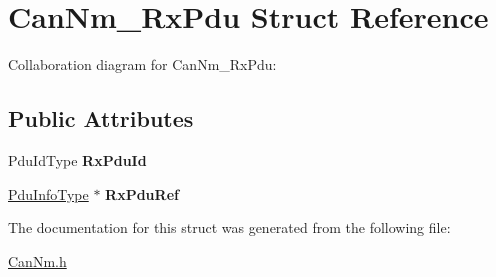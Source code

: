 \hypertarget{structCanNm__RxPdu}{}\section{Can\+Nm\+\_\+\+Rx\+Pdu Struct Reference}
\label{structCanNm__RxPdu}


Collaboration diagram for Can\+Nm\+\_\+\+Rx\+Pdu\+:
\subsection*{Public Attributes}
\begin{DoxyCompactItemize}
\item 
Pdu\+Id\+Type {\bfseries Rx\+Pdu\+Id}\hypertarget{structCanNm__RxPdu_a4f2c2315ab7caa2f03a7f9c6d22ec37c}{}\label{structCanNm__RxPdu_a4f2c2315ab7caa2f03a7f9c6d22ec37c}

\item 
\hyperlink{structPduInfoType}{Pdu\+Info\+Type} $\ast$ {\bfseries Rx\+Pdu\+Ref}\hypertarget{structCanNm__RxPdu_a372cc1beab501d5752eb75cfe308c254}{}\label{structCanNm__RxPdu_a372cc1beab501d5752eb75cfe308c254}

\end{DoxyCompactItemize}


The documentation for this struct was generated from the following file\+:\begin{DoxyCompactItemize}
\item 
\hyperlink{CanNm_8h}{Can\+Nm.\+h}\end{DoxyCompactItemize}
